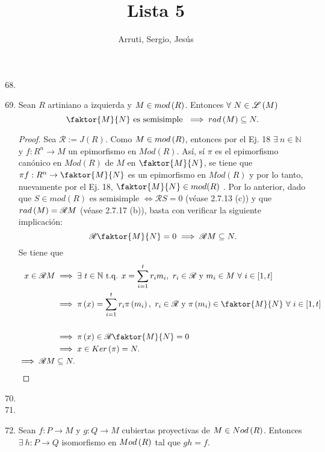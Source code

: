 \documentclass{article}
\title{Lista 5}
\author{Arruti, Sergio, Jesús}
\date{}
\begin{document}
	\maketitle
	\begin{enumerate}[label=\textbf{Ej \arabic*.}]
		\setcounter{enumi}{67}
		\item	 
		\item Sean $R$ artiniano a izquierda y $M\in mod\left(R\right)$. Entonces
		$\forall\ N\in\genlin{M}$ 
		\begin{equation*}
			\faktor{M}{N}\text{ es semisimple }\implies rad\lrprth{M}\subseteq N.
		\end{equation*}
		\begin{proof}
			Sea $\mathscr{R}:=J(R)$. Como $M\in mod\left(R\right)$, entonces por el Ej. 18 $\exists\ n\in\mathbb{N}$ y $f:R^n\to M$ un epimorfismo en  $Mod(R)$. Así, sí $\pi$ es el epimorfismo canónico en $Mod(R)$ de $M$ en $\faktor{M}{N}$, se tiene que $\pi f:R^n\to \faktor{M}{N}$ es un epimorfismo en $Mod(R)$ y por lo tanto, nuevamente por el Ej. 18, $\faktor{M}{N}\in mod(R)$ . Por lo anterior, dado que $S\in mod(R)\text{ es semisimple }\iff \mathscr{R}S=0$ (véase 2.7.13 (c)) y que $rad\left(M\right)=\mathscr{R}M$ (véase 2.7.17 (b)), basta con verificar la siguiente implicación:
			\begin{equation*}
				\mathscr{R}\faktor{M}{N}=0\implies \mathscr{R} M\subseteq N.
			\end{equation*}
			Se tiene que
			\begin{align*}
				x\in\mathscr{R}M&\implies \exists\ t\in\mathbb{N}\text{ t.q. } x=\sum\limits_{i=1}^{t}r_im_i,\ r_i\in\mathscr{R}\text{ y } m_i\in M\ \forall\ i\in[1,t]\\
				&\implies \pi\lrprth{x}=\sum\limits_{i=1}^{t}r_i\pi\lrprth{m_i},\ r_i\in\mathscr{R}\text{ y } \pi\lrprth{m_i}\in \faktor{M}{N}\ \forall\ i\in[1,t]\\\\
				&\implies \pi\lrprth{x}\in\mathscr{R}\faktor{M}{N}=0\\
				&\implies x\in Ker\lrprth{\pi}=N.\\
				\implies \mathscr{R} M&\subseteq N.
			\end{align*}
		\end{proof}
		\item 
		\item
		\item Sean $f:P\to M$ y $g:Q\to M$ 	cubiertas proyectivas de $M\in Nod\left(R\right)$. Entonces $\exists\ h:P\to Q$ isomorfismo en $Mod\left(R\right)$ tal que $gh=f$.

\end{enumerate}
\end{document}
